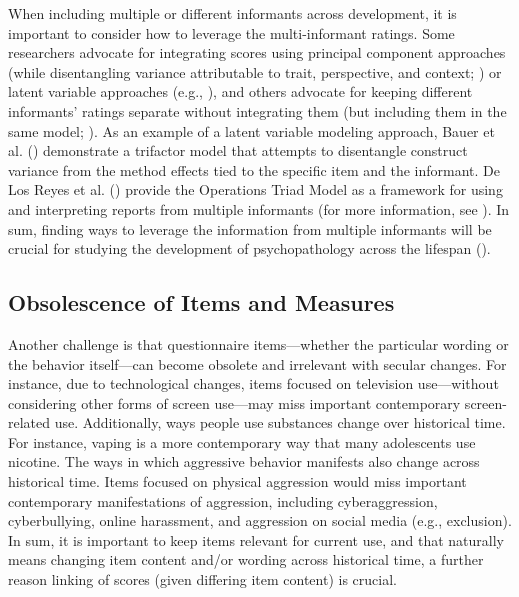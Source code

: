 \documentclass[
  american,
  letterpaper,
  12pt]{article}
\begin{document}
When including multiple or different informants across development, it
is important to consider how to leverage the multi-informant ratings.
Some researchers advocate for integrating scores using principal
component approaches (while disentangling variance attributable to
trait, perspective, and context; ) or latent variable approaches (e.g.,
), and others advocate for
keeping different informants' ratings separate without integrating them
(but including them in the same model; ). As an example of a latent variable modeling approach,
Bauer et al. () demonstrate a trifactor
model that attempts to disentangle construct variance from the method
effects tied to the specific item and the informant. De Los Reyes et al.
() provide the Operations Triad Model
as a framework for using and interpreting reports from multiple
informants (for more information, see ). In sum, finding ways to leverage the information from
multiple informants will be crucial for studying the development of
psychopathology across the lifespan ().

\subsection{Obsolescence of Items and
Measures}\label{obsolescence-of-items-and-measures}

Another challenge is that questionnaire items---whether the particular
wording or the behavior itself---can become obsolete and irrelevant with
secular changes. For instance, due to technological changes, items
focused on television use---without considering other forms of screen
use---may miss important contemporary screen-related use. Additionally,
ways people use substances change over historical time. For instance,
vaping is a more contemporary way that many adolescents use nicotine.
The ways in which aggressive behavior manifests also change across
historical time. Items focused on physical aggression would miss
important contemporary manifestations of aggression, including
cyberaggression, cyberbullying, online harassment, and aggression on
social media (e.g., exclusion). In sum, it is important to keep items
relevant for current use, and that naturally means changing item content
and/or wording across historical time, a further reason linking of
scores (given differing item content) is crucial.
\end{document}
